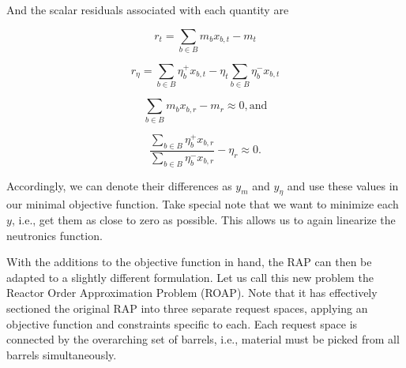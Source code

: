 And the scalar residuals associated with each quantity are 

\begin{equation}\label{eqs:mass_resid}
r_{t} =  \sum_{b \in B} m_{b} x_{b,t} - m_{t}
\end{equation}

\begin{equation}\label{eqs:eta_obj}
r_{\eta} =  \sum_{b \in B} \eta_{b}^{+} x_{b,t}
- \eta_{t} \sum_{b \in B} \eta_{b}^{-} x_{b,t}
\end{equation}

\begin{equation*}
  \sum_{b \in B} m_{b} x_{b,r} - m_{r} \approx 0, \mbox{and}
\end{equation*}

\begin{equation*}
\frac{\sum_{b \in B} \eta_{b}^{+} x_{b,r}}
     {\sum_{b \in B} \eta_{b}^{-} x_{b,r}} 
- \eta_{r} \approx 0.
\end{equation*}

Accordingly, we can denote their differences as $y_{m}$ and $y_{\eta}$ and use
these values in our minimal objective function. Take special note that we want
to minimize each $y$, i.e., get them as close to zero as possible. This allows
us to again linearize the neutronics function.

With the additions to the objective function in hand, the RAP can then be
adapted to a slightly different formulation. Let us call this new problem the
Reactor Order Approximation Problem (ROAP). Note that it has effectively
sectioned the original RAP into three separate request spaces, applying an
objective function and constraints specific to each. Each request space is
connected by the overarching set of barrels, i.e., material must be picked from
all barrels simultaneously.

